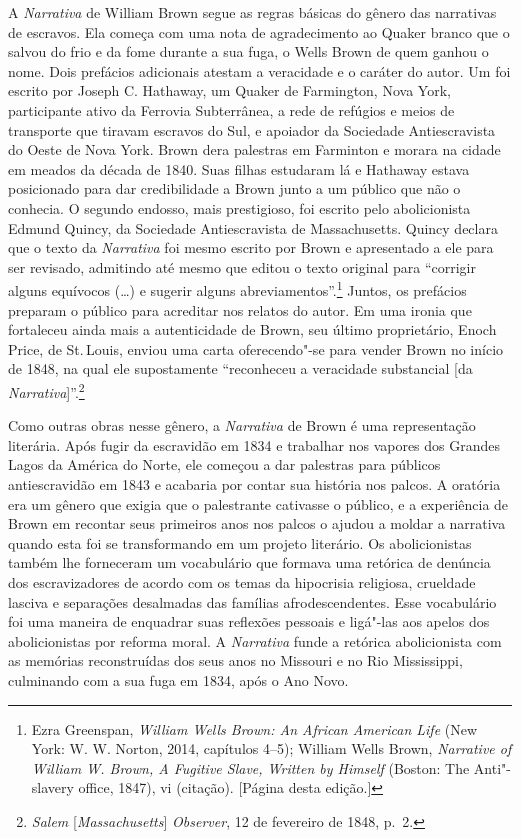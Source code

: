 A \emph{Narrativa} de William Brown segue as regras básicas do gênero
das narrativas de escravos. Ela começa com uma nota de agradecimento ao
Quaker branco que o salvou do frio e da fome durante a sua fuga, o Wells %
Brown de quem ganhou o nome. Dois prefácios adicionais atestam a
veracidade e o caráter do autor. Um foi escrito por Joseph C. Hathaway,
um Quaker de Farmington, Nova York, participante ativo da Ferrovia
Subterrânea, a rede de refúgios e meios de transporte que tiravam
escravos do Sul, e apoiador da Sociedade Antiescravista do Oeste de Nova
York. Brown dera palestras em Farminton e morara na cidade em meados da
década de 1840. Suas filhas estudaram lá e Hathaway estava posicionado
para dar credibilidade a Brown junto a um público que não o conhecia. O
segundo endosso, mais prestigioso, foi escrito pelo abolicionista Edmund
Quincy, da Sociedade Antiescravista de Massachusetts. Quincy declara que
o texto da \emph{Narrativa} foi mesmo escrito por Brown e apresentado a
ele para ser revisado, admitindo até mesmo que editou o texto original
para ``corrigir alguns equívocos (\ldots{}) e sugerir alguns
abreviamentos''.\footnote{Ezra Greenspan, \emph{William Wells Brown: An
  African American Life} (New York: W. W. Norton, 2014, capítulos 4--5);
  William Wells Brown, \emph{Narrative of William W. Brown, A Fugitive
  Slave, Written by Himself} (Boston: The Anti"-slavery office, 1847), vi
  (citação). {[}Página \pageref{ref1} desta edição.{]}} Juntos, os prefácios
preparam o público para acreditar nos relatos do autor. Em uma ironia
que fortaleceu ainda mais a autenticidade de Brown, seu último
proprietário, Enoch Price, de St.\,Louis, enviou uma carta oferecendo"-se
para vender Brown no início de 1848, na qual ele supostamente
``reconheceu a veracidade substancial {[}da
\emph{Narrativa}{]}''.\footnote{\emph{Salem} {[}\emph{Massachusetts}{]}
  \emph{Observer}, 12 de fevereiro de 1848, p.~2.}

Como outras obras nesse gênero, a \emph{Narrativa} de Brown é uma
representação literária. Após fugir da escravidão em 1834 e trabalhar
nos vapores dos Grandes Lagos da América do Norte, ele começou a dar
palestras para públicos antiescravidão em 1843 e acabaria por contar sua
história nos palcos. A oratória era um gênero que exigia que o
palestrante cativasse o público, e a experiência de Brown em recontar
seus primeiros anos nos palcos o ajudou a moldar a narrativa quando esta
foi se transformando em um projeto literário. Os abolicionistas também
lhe forneceram um vocabulário que formava uma retórica de denúncia dos
escravizadores de acordo com os temas da hipocrisia religiosa, crueldade
lasciva e separações desalmadas das famílias afrodescendentes. Esse
vocabulário foi uma maneira de enquadrar suas reflexões pessoais e
ligá"-las aos apelos dos abolicionistas por reforma moral. A
\emph{Narrativa} funde a retórica abolicionista com as memórias
reconstruídas dos seus anos no Missouri e no Rio Mississippi, culminando
com a sua fuga em 1834, após o Ano Novo.

